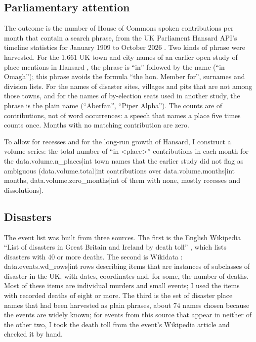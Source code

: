 \documentclass[11pt,a4paper]{article}
\begin{document}
\subsection{Parliamentary attention}
The outcome is the number of House of Commons spoken contributions per month that contain a search phrase, from the UK Parliament Hansard API's timeline statistics for January 1909 to October 2026 \citep{Hansard2026}. Two kinds of phrase were harvested. For the 1,661 UK town and city names of an earlier open study of place mentions in Hansard \citep{Hotham2026}, the phrase is ``in'' followed by the name (``in Omagh''); this phrase avoids the formula ``the hon. Member for'', surnames and division lists. For the names of disaster sites, villages and pits that are not among those towns, and for the names of by-election seats used in another study, the phrase is the plain name (``Aberfan'', ``Piper Alpha''). The counts are of contributions, not of word occurrences: a speech that names a place five times counts once. Months with no matching contribution are zero.

To allow for recesses and for the long-run growth of Hansard, I construct a volume series: the total number of ``in <place>'' contributions in each month for the {{data.volume.n_places|int}} town names that the earlier study did not flag as ambiguous ({{data.volume.total|int}} contributions over {{data.volume.months|int}} months, {{data.volume.zero_months|int}} of them with none, mostly recesses and dissolutions).

\subsection{Disasters}
The event list was built from three sources. The first is the English Wikipedia ``List of disasters in Great Britain and Ireland by death toll'' \citep{Wikipedia2026}, which lists disasters with 40 or more deaths. The second is Wikidata \citep{Vrandecic2014}: {{data.events.wd_rows|int}} rows describing items that are instances of subclasses of disaster in the UK, with dates, coordinates and, for some, the number of deaths. Most of these items are individual murders and small events; I used the items with recorded deaths of eight or more. The third is the set of disaster place names that had been harvested as plain phrases, about 74 names chosen because the events are widely known; for events from this source that appear in neither of the other two, I took the death toll from the event's Wikipedia article and checked it by hand.
\end{document}
